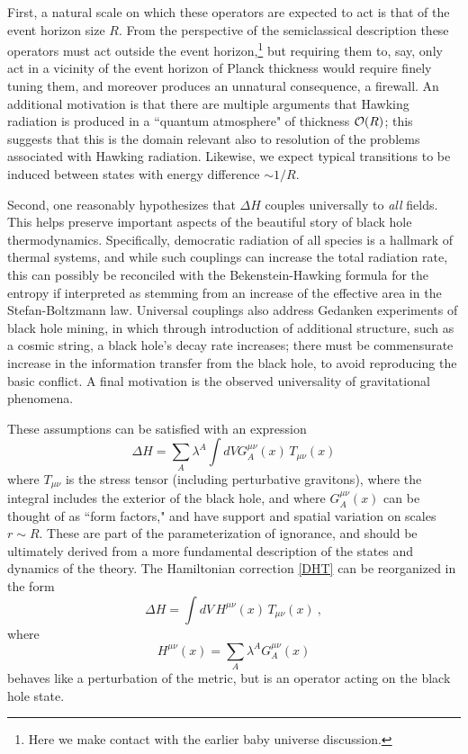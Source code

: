 \documentclass[12pt]{article}
\numberwithin{equation}{section}
\newcommand{\calo}{{\cal O}}
\newcommand{\beq}{\begin{equation}}
\newcommand{\eeq}{\end{equation}}
\begin{document}
First, a natural scale on which these operators are expected to act is that of the event horizon size $R$.  From the perspective of the semiclassical description these operators must act outside the event horizon,\footnote{Here we make contact with the earlier baby universe discussion.} but requiring them to, say, only act in a vicinity of the event horizon of Planck thickness would require finely tuning them, and moreover produces an unnatural consequence, a firewall\cite{SGTrieste,Brau}\cite{AMPS}.   An additional motivation is that there are multiple arguments\cite{SGBoltz,DLP}\cite{SGsch,SG2d,GiPe} that Hawking radiation is produced in a ``quantum atmosphere" of thickness $\calo(R)$; this suggests that this is the domain relevant also to resolution of the problems associated with Hawking radiation.   Likewise, we expect typical transitions to be induced between states with energy difference $\sim 1/R$.

Second, one reasonably hypothesizes that $\Delta H$ couples universally to {\it all} fields.  This helps preserve important aspects of the beautiful story of black hole thermodynamics.  Specifically, democratic radiation of all species is a hallmark of thermal systems, and while such couplings can increase the total radiation rate, this can possibly be reconciled with the Bekenstein-Hawking formula for the entropy if interpreted as stemming from an increase of the effective area in the Stefan-Boltzmann law\cite{SGBoltz}.  Universal couplings also address\cite{NVNL,NVUEFT,NVNLT} Gedanken experiments of black hole mining\cite{UnWamine,LaMa,FrFu,Frol}, in which through introduction of additional structure, such as a cosmic string, a black hole's decay rate increases; there must be commensurate increase in the information transfer from the black hole, to avoid reproducing the basic conflict.  A final motivation is the observed universality of gravitational phenomena.

These assumptions can be satisfied with an expression
\beq\label{DHT}
\Delta H = \sum_A \lambda^A \int dV G_A^{\mu\nu}(x)\,T_{\mu\nu}(x)
\eeq
where $T_{\mu\nu}$ is the stress tensor (including perturbative gravitons), where the integral includes the exterior of the black hole, and where $G^{\mu\nu}_A(x)$ can be thought of as ``form factors," and have support and spatial variation on scales $r\sim R$.  These are part of the parameterization of ignorance, and should be ultimately derived from a more fundamental description of the states and dynamics of the theory.  
The Hamiltonian correction \eqref{DHT} can be reorganized in the form
\beq
\Delta H = \int dV\, H^{\mu\nu}(x) \,T_{\mu\nu}(x)\ ,
\eeq
where 
\beq
H^{\mu\nu}(x)=\sum_A\lambda^A G_A^{\mu\nu}(x)
\eeq
behaves like a perturbation of the metric, but is an operator acting on the black hole state.
\end{document}
